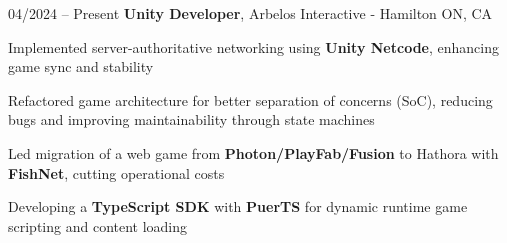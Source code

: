 \begin{twocolentry}{
    04/2024 – Present
}
\fontsize{11 pt}{11 pt}\textbf{Unity Developer}, Arbelos Interactive - Hamilton ON, CA \end{twocolentry}

\vspace{0.10 cm}
\begin{onecolentry}
   \begin{highlights}
       \item Implemented server-authoritative networking using \textbf{Unity Netcode}, enhancing game sync and stability
       \item Refactored game architecture for better separation of concerns (SoC), reducing bugs and improving maintainability through state machines
       \item Led migration of a web game from \textbf{Photon/PlayFab/Fusion} to Hathora with \textbf{FishNet}, cutting operational costs
       \item Developing a \textbf{TypeScript SDK} with \textbf{PuerTS} for dynamic runtime game scripting and content loading
   \end{highlights}
\end{onecolentry}